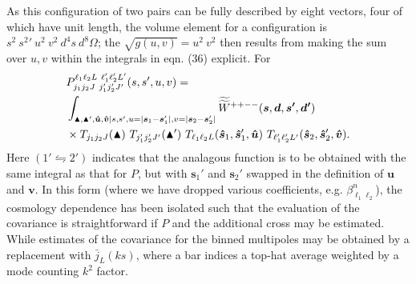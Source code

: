 \documentclass[useAMS,usenatbib]{mn2e}
\begin{document}
As this configuration of two pairs can be fully described by eight vectors, four of which have unit length, the volume element for a configuration is $s^2 \ s^2{}' \ u^2 \ v^2 \ d^4s \ d^8 \Omega$; the $\sqrt{g(u,v)} = u^2 \ v^2$ then results from making the sum over $u,v$ within the integrals in eqn. (36) explicit. 
For 
\begin{align}
&P_{j_1 j_2 J \  j_1' j_2' J'}^{\ell_1 \ell_2 L \ \ell_1' \ell_2' L'}(s, s', u, v) = \notag \\ &\int_{\blacktriangle, \blacktriangle', \boldsymbol{\hat u}, \boldsymbol{\hat v} | s, s', u = |\boldsymbol s_1 - \boldsymbol s_1'|, v = |\boldsymbol s_2 - \boldsymbol s_2'|}
\widetilde{\widetilde W} {}^{++--}(\boldsymbol{s}, \boldsymbol{d}, \boldsymbol{s'}, \boldsymbol{d'}) \notag \\ 
& \times T_{j_1 j_2 J}(\blacktriangle) \ 
T_{j_1' j_2' J'}(\blacktriangle') \ T_{\ell_1 \ell_2 L}(\boldsymbol{\hat s}_1, \boldsymbol{\hat s}_1', \boldsymbol{\hat u})
\ T_{\ell_1' \ell_2' L'}(\boldsymbol{\hat s}_2, \boldsymbol{\hat s}_2', \boldsymbol{\hat v}).
\end{align}
Here $(1' \leftrightharpoons 2')$ indicates that the analagous function is to be obtained with the same integral as that for $P$, but with $\boldsymbol s_1'$ and $\boldsymbol s_2'$ swapped in the definition of $\boldsymbol{u}$ and $\boldsymbol{v}$.  In this form (where we have dropped various coefficients, e.g. $\beta^{n}_{\ell_1 \ell_2}$), the cosmology dependence has been isolated such that the evaluation of the covariance is straightforward if $P$ and the additional cross may be estimated.  While estimates of the covariance for the binned multipoles may be obtained by a replacement with $\bar j_L(ks)$, where a bar indices a top-hat average weighted by a mode counting $k^2$ factor.
\end{document}
